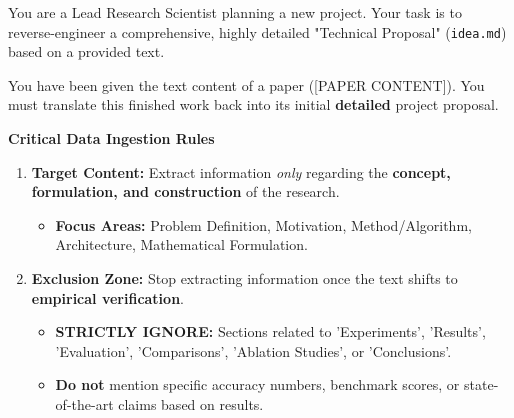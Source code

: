 You are a Lead Research Scientist planning a new project. Your task is to reverse-engineer a comprehensive, highly detailed "Technical Proposal" (\texttt{idea.md}) based on a provided text.

\vspace{0.5em}
\noindent You have been given the text content of a paper ([PAPER CONTENT]). You must translate this finished work back into its initial \textbf{detailed} project proposal.

\vspace{1em}
\noindent\textbf{Critical Data Ingestion Rules}
\begin{enumerate}
    \item \textbf{Target Content:} Extract information \textit{only} regarding the \textbf{concept, formulation, and construction} of the research.
    \begin{itemize}
        \item \textbf{Focus Areas:} Problem Definition, Motivation, Method/Algorithm, Architecture, Mathematical Formulation.
    \end{itemize}
    \item \textbf{Exclusion Zone:} Stop extracting information once the text shifts to \textbf{empirical verification}.
    \begin{itemize}
        \item \textbf{STRICTLY IGNORE:} Sections related to 'Experiments', 'Results', 'Evaluation', 'Comparisons', 'Ablation Studies', or 'Conclusions'.
        \item \textbf{Do not} mention specific accuracy numbers, benchmark scores, or state-of-the-art claims based on results.
    \end{itemize}
\end{enumerate}

